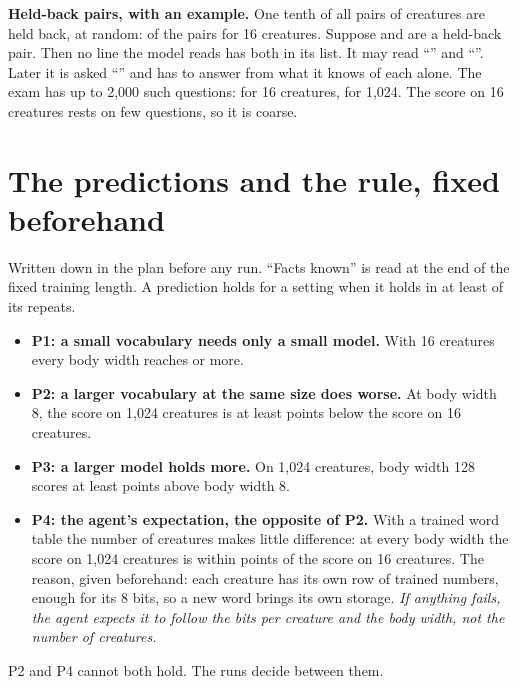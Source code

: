 \textbf{Held-back pairs, with an example.} One tenth of all pairs of creatures are held back, at
random:  of the  pairs for 16 creatures. Suppose  and
 are a held-back pair. Then no line the model reads has both in its list. It may read
``'' and ``''. Later it is asked
``'' and has to answer from what it knows of each alone. The
exam has up to 2,000 such questions:  for 16 creatures,  for
1,024. The score on 16 creatures rests on few questions, so it is coarse.

\section{The predictions and the rule, fixed beforehand}\label{sec:rule}

Written down in the plan before any run. ``Facts known'' is read at the end of the fixed
training length. A prediction holds for a setting when it holds in at least  of
its  repeats.

\begin{itemize}
\item \textbf{P1: a small vocabulary needs only a small model.} With 16 creatures every body
  width reaches  or more.
\item \textbf{P2: a larger vocabulary at the same size does worse.} At body width 8, the score on
  1,024 creatures is at least  points below the score on 16 creatures.
\item \textbf{P3: a larger model holds more.} On 1,024 creatures, body width 128 scores at least
   points above body width 8.
\item \textbf{P4: the agent's expectation, the opposite of P2.} With a trained word table the
  number of creatures makes little difference: at every body width the score on 1,024 creatures
  is within  points of the score on 16 creatures. The reason, given beforehand: each
  creature has its own row of  trained numbers, enough for its 8 bits, so a new
  word brings its own storage. \emph{If anything fails, the agent expects it to follow the bits
  per creature and the body width, not the number of creatures.}
\end{itemize}

P2 and P4 cannot both hold. The runs decide between them.

